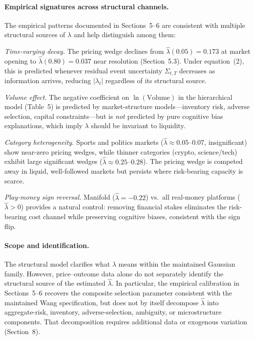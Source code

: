 \documentclass[12pt,a4paper]{article}
\begin{document}
\paragraph{Empirical signatures across structural channels.}
The empirical patterns documented in Sections~5--6 are consistent with multiple structural sources of $\lambda$ and help distinguish among them:

\emph{Time-varying decay.} The pricing wedge declines from $\hat\lambda(0.05)=0.173$ at market opening to $\hat\lambda(0.80)=0.037$ near resolution (Section~5.3). Under equation~(2), this is predicted whenever residual event uncertainty $\Sigma_{t,T}$ decreases as information arrives, reducing $|\lambda_t|$ regardless of its structural source.

\emph{Volume effect.} The negative coefficient on $\ln(\text{Volume})$ in the hierarchical model (Table~5) is predicted by market-structure models---inventory risk, adverse selection, capital constraints---but is \emph{not} predicted by pure cognitive bias explanations, which imply $\lambda$ should be invariant to liquidity.

\emph{Category heterogeneity.} Sports and politics markets ($\hat\lambda\approx 0.05$--$0.07$, insignificant) show near-zero pricing wedges, while thinner categories (crypto, science/tech) exhibit large significant wedges ($\hat\lambda\approx 0.25$--$0.28$). The pricing wedge is competed away in liquid, well-followed markets but persists where risk-bearing capacity is scarce.

\emph{Play-money sign reversal.} Manifold ($\hat\lambda=-0.22$) vs.\ all real-money platforms ($\hat\lambda>0$) provides a natural control: removing financial stakes eliminates the risk-bearing cost channel while preserving cognitive biases, consistent with the sign flip.

\paragraph{Scope and identification.}
The structural model clarifies what $\lambda$ means within the maintained Gaussian family. However, price--outcome data alone do not separately identify the structural source of the estimated $\hat\lambda$. In particular, the empirical calibration in Sections~5--6 recovers the composite selection parameter consistent with the maintained Wang specification, but does not by itself decompose $\hat\lambda$ into aggregate-risk, inventory, adverse-selection, ambiguity, or microstructure components. That decomposition requires additional data or exogenous variation (Section~8).
\end{document}

